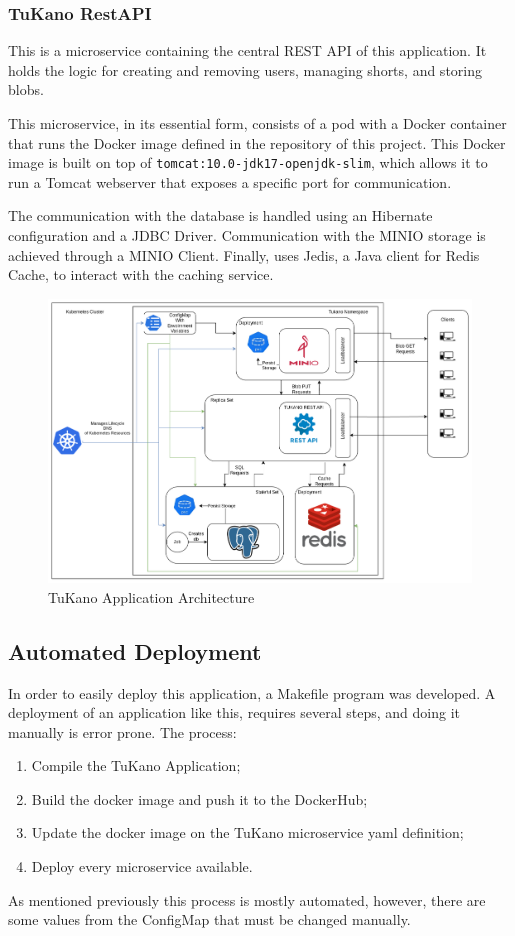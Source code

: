 \documentclass[10pt,a4paper,twocolumn]{article}
\begin{document}
\subsubsection{TuKano RestAPI}
This is a microservice containing the central REST API of this application. It holds the logic for creating and removing users, managing shorts, and storing blobs.
\par This microservice, in its essential form, consists of a pod with a Docker container that runs the Docker image defined in the repository of this project. This Docker image is built on top of \verb|tomcat:10.0-jdk17-openjdk-slim|, which allows it to run a Tomcat webserver that exposes a specific port for communication.
\par The communication with the database is handled using an Hibernate configuration and a JDBC Driver\cite{jdbc}. Communication with the MINIO storage is achieved through a MINIO Client\cite{minioClient}. Finally, uses Jedis\cite{jedis}, a Java client for Redis Cache, to interact with the caching service.



\begin{figure}[h]
  \centering
  \includegraphics[width=\textwidth]{TuKanoArch.png}
  \caption{TuKano Application Architecture}
  \label{fig:tukano_architecture}
\end{figure}


\subsection{Automated Deployment}
\label{sec:automatedDepl}
In order to easily deploy this application, a Makefile program was developed. A deployment of an application like this, requires several steps, and doing it manually is error prone.
The process:
\begin{enumerate}
  \itemsep0em 
  \item Compile the TuKano Application;
  \item Build the docker image and push it to the DockerHub;
  \item Update the docker image on the TuKano microservice yaml definition;
  \item Deploy every microservice available.
\end{enumerate}
As mentioned previously this process is mostly automated, however, there are some values from the ConfigMap that must be changed manually.
\end{document}
